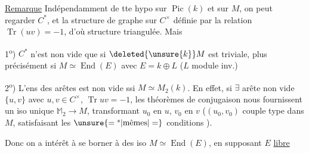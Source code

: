 \uline{Remarque} Indépendamment de tte hypo sur $\operatorname{Pic}(k)$ et sur $M$, on peut regarder $C^*$, et la structure de graphe sur $C^\times$ définie par la relation $\operatorname{Tr}(uv)=-1$, d'où structure triangulée. Mais

1\textsuperscript{o}) $C^*$  n'est non vide que si $\deleted{\unsure{k}}M$ est triviale, plus précisément si $M\simeq\operatorname{End}(E)$ avec $E=k\oplus L$ ($L$ module inv.)

 2\textsuperscript{o})  L'ens des arêtes est non vide ssi $M\simeq M_2(k)$. En effet, si $\exists$ arête non vide $\{u,v\}$  avec $u,v\in C^\times$, $\operatorname{Tr}uv=-1$, les théorèmes de conjugaison nous fournissent un iso unique $\mathbb M_2\longrightarrow M$, transformant $u_0$ en $u$, $v_0$ en $v$ ($(u_0,v_0)$ couple type dans $M$, satisfaisant les $\unsure{={}^s|\text{mêmes}|=}$ conditions ).

Donc on a intérêt à se borner  à des iso $M\simeq\operatorname{End}(E)$, en supposant $E$ \uline{libre}

